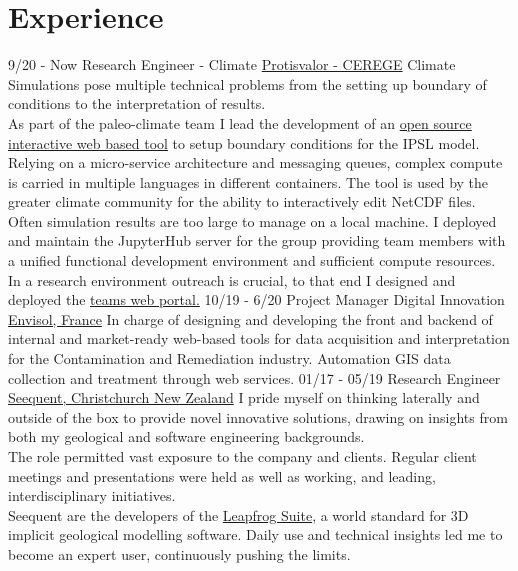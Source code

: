 \documentclass[]{friggeri-cv}
\begin{document}
\section{Experience}
\begin{entrylist}
  \entry
  {9/20 - Now}
  {Research Engineer - Climate}
  {\href{https://cerege-cl.github.io/}{Protisvalor - CEREGE}}
  {Climate Simulations pose multiple technical problems from the setting up boundary of conditions to the interpretation of results.
  \\[3pt]
  As part of the paleo-climate team I lead the development of an \href{https://cerege-cl.github.io/netcdf_editor_app/}{open source interactive web based tool} to setup boundary conditions for the IPSL model. Relying on a micro-service architecture and messaging queues, complex compute is carried in multiple languages in different containers. The tool is used by the greater climate community for the ability to interactively edit NetCDF files.
  \\[3pt]
  Often simulation results are too large to manage on a local machine. I deployed and maintain the JupyterHub server for the group providing team members with a unified functional development environment and sufficient compute resources.
  \\[3pt]
  In a research environment outreach is crucial, to that end I designed and deployed the \href{https://cerege-cl.github.io/}{teams web portal.}}
  \entry
  {10/19 - 6/20}
  {Project Manager Digital Innovation}
  {\href{http://envisol.net/}{Envisol, France}}
  {In charge of designing and developing the front and backend of internal and market-ready web-based tools for data acquisition and interpretation for the Contamination and Remediation industry. Automation GIS data collection and treatment through web services.}
  \entry
    {01/17 - 05/19}
    {Research Engineer}
    {\href{https://www.seequent.com/}{Seequent, Christchurch New Zealand}}
    {I pride myself on thinking laterally and outside of the box to provide novel innovative solutions, drawing on insights from both my geological and software engineering backgrounds.
    \\[3pt]
    The role permitted vast exposure to the company and clients. Regular client meetings and presentations were held as well as working, and leading, interdisciplinary initiatives.
    \\[3pt]
    Seequent are the developers of the \href{https://www.leapfrog3d.com/}{Leapfrog Suite}, a world standard for 3D implicit geological modelling software. Daily use and technical insights led me to become an expert user, continuously pushing the limits.
    \\[6pt]
}
        \end{entrylist}
\end{document}
